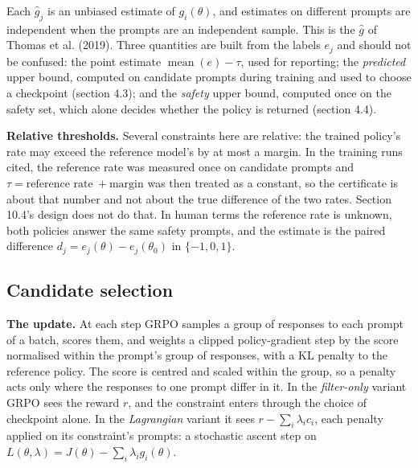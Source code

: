 \documentclass[11pt]{article}
\begin{document}
Each $\hat{g}_{j}$ is an unbiased estimate of $g_{i} (\theta )$, and estimates on different prompts are independent when the prompts are an independent sample. This is the $\hat{g}$ of Thomas et al. (2019). Three quantities are built from the labels $e_{j}$ and should not be confused: the point estimate $\operatorname{mean} (e ) - \tau$, used for reporting; the \emph{predicted} upper bound, computed on candidate prompts during training and used to choose a checkpoint (section 4.3); and the \emph{safety} upper bound, computed once on the safety set, which alone decides whether the policy is returned (section 4.4).


\textbf{Relative thresholds.} Several constraints here are relative: the trained policy's rate may exceed the reference model's by at most a margin. In the training runs cited, the reference rate was measured once on candidate prompts and $\tau = \text{reference rate}\ + \text{margin}$ was then treated as a constant, so the certificate is about that number and not about the true difference of the two rates. Section 10.4's design does not do that. In human terms the reference rate is unknown, both policies answer the same safety prompts, and the estimate is the paired difference $d_{j} = e_{j} (\theta ) - e_{j} (\theta_{0} )$ in $\{-1, 0, 1\}$.


\subsection{Candidate selection}

\textbf{The update.} At each step GRPO samples a group of responses to each prompt of a batch, scores them, and weights a clipped policy-gradient step by the score normalised within the prompt's group of responses, with a KL penalty to the reference policy. The score is centred and scaled within the group, so a penalty acts only where the responses to one prompt differ in it. In the \emph{filter-only} variant GRPO sees the reward $r$, and the constraint enters through the choice of checkpoint alone. In the \emph{Lagrangian} variant it sees $r - \sum_{i} \lambda_{i} c_{i}$, each penalty applied on its constraint's prompts: a stochastic ascent step on $L (\theta , \lambda ) = J (\theta ) - \sum_{i} \lambda_{i} g_{i} (\theta )$.
\end{document}
